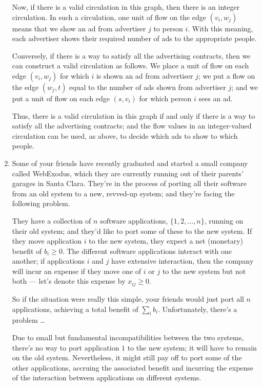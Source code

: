 \documentclass[12pt]{article}
\begin{document}
\begin{enumerate}
{Now, if there is a valid circulation in this graph, then
there is an integer circulation.
In such a circulation, one unit of flow on the edge
$(v_i, w_j)$ means that we show an ad from advertiser $j$ to person $i$.
With this meaning, each advertiser shows their required
number of ads to the appropriate people.

Conversely, if there is a way to satisfy all the advertising
contracts, then we can construct a valid circulation as follows.
We place a unit of flow on each edge $(v_i, w_j)$
for which $i$ is shown an ad from advertiser $j$;
we put a flow on the edge $(w_j, t)$ equal to 
the number of ads shown from advertiser $j$;
and we put a unit of flow on each edge $(s,v_i)$
for which person $i$ sees an ad.

Thus, there is a valid circulation in this graph if
and only if there is a way to satisfy all the advertising
contracts; and the flow values in an integer-valued
circulation can be used, as above, to decide which
ads to show to which people.

}



\item 

Some of your friends have recently graduated
and started a small company called WebExodus, which they
are currently running out of their parents' garages in Santa Clara.
They're in the process of porting all
their software from an old system to a new, revved-up system;
and they're facing the following problem.

They have a collection of $n$ software applications,
$\{1, 2, \ldots, n\}$, running on their old system;
and they'd like to port some of these to the new system.
If they move application $i$ to the new system, they expect a
net (monetary) benefit of $b_i \geq 0$.
The different software applications interact with one another;
if applications
$i$ and $j$ have extensive interaction, then the company will incur
an expense if they move one of $i$ or $j$ to the new system but not both ---
let's denote this expense by $x_{ij} \geq 0$.

So if the situation were really this simple, your friends would
just port all $n$ applications,
achieving a total benefit of $\sum_i b_i$.
Unfortunately, there's a problem \ldots\

Due to small but fundamental incompatibilities between the two systems,
there's no way to port application $1$ to the new system;
it will have to remain on the old system.
Nevertheless, it might still pay off to port some of the
other applications, accruing the associated benefit and
incurring the expense of the interaction between applications
on different systems.


\end{enumerate}
\end{document}
